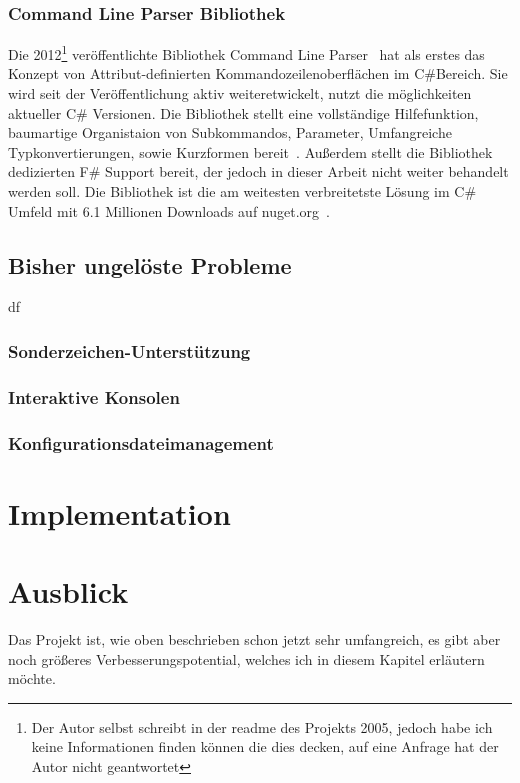 \documentclass[a4paper,11pt,titlepage,ngerman]{article}
\begin{document}
\begin{sloppypar}
  \subsubsection{Command Line Parser Bibliothek}
  Die 2012\footnote{Der Autor selbst schreibt in der readme des Projekts 2005, jedoch habe ich keine Informationen finden können die dies decken, auf eine Anfrage hat der Autor nicht geantwortet} veröffentlichte Bibliothek Command Line Parser~\cite{FirstCommandLineParserCommit}  
  hat als erstes das Konzept von Attribut-definierten Kommandozeilenoberflächen im C\#Bereich.
  Sie wird seit der Veröffentlichung aktiv weiteretwickelt, nutzt die möglichkeiten aktueller C\# Versionen.
  Die Bibliothek stellt eine vollständige Hilfefunktion, baumartige Organistaion von Subkommandos, Parameter, Umfangreiche Typkonvertierungen, sowie Kurzformen bereit~\cite{CommandLineParserWiki}.
  Au\ss erdem stellt die Bibliothek dedizierten F\# Support bereit, der jedoch in dieser Arbeit nicht weiter behandelt werden soll.
  Die Bibliothek ist die am weitesten verbreitetste Lösung im C\# Umfeld mit 6.1 Millionen Downloads auf nuget.org~\cite{CommandLineParserNuget}. 
  \subsection{Bisher ungelöste Probleme}\label{subsec:currentproblems}
  df
  \subsubsection{Sonderzeichen-Unterstützung}
  \subsubsection{Interaktive Konsolen}
  \subsubsection{Konfigurationsdateimanagement}
  \section{Implementation}\label{sec:Content}
  

  \section{Ausblick}\label{sec:Future}
  Das Projekt ist, wie oben beschrieben schon jetzt sehr umfangreich, es gibt aber noch grö\ss eres Verbesserungspotential, welches ich in diesem Kapitel erl\"autern m\"ochte.

\end{sloppypar}
\end{document}
